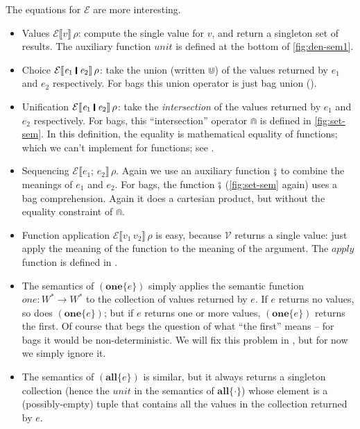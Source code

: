\documentclass[acmsmall,review,dvipsnames]{acmart}
\newcommand{\Varid}[1]{\mathit{#1}}
\newcommand{\Value}{W}
\newcommand{\semfun}[1]{\mathcal{#1}}
\newcommand{\semapp}[3]{\semfun{#1}\llbracket #2 \rrbracket\, #3}
\newcommand{\mtype}{\Value^{*}}
\newcommand{\munit}{\mathit{unit}}
\newcommand{\mintersect}{\Cap}
\newcommand{\munion}{\Cup}
\newcommand{\msemi}{\fatsemi}
\newcommand{\mone}{\mathit{one}}
\newcommand{\apply}{\mathit{apply}}
\begin{document}
The equations for $\semfun{E}$ are more interesting.
\begin{itemize}
\item Values $\semapp{E}{\ensuremath{\Varid{v}}}{\rho}$: compute the single value for \ensuremath{\Varid{v}}, and return a singleton set of results.
The auxiliary function $\munit$ is defined at the bottom of \cref{fig:den-sem1}.
\item Choice $\semapp{E}{\ensuremath{\Varid{e}_{\mathrm{1}}\;\rule[-0.1em]{0.15em}{0.75em}\;\Varid{e}_{\mathrm{2}}}}{\rho}$: take the union (written $\munion$) of the values
  returned by \ensuremath{\Varid{e}_{\mathrm{1}}} and \ensuremath{\Varid{e}_{\mathrm{2}}} respectively.  For bags this union operator is just bag union ().
\item Unification $\semapp{E}{\ensuremath{\Varid{e}_{\mathrm{1}}\;\rule[-0.1em]{0.15em}{0.75em}\;\Varid{e}_{\mathrm{2}}}}{\rho}$: take the \emph{intersection} of the
  values returned by \ensuremath{\Varid{e}_{\mathrm{1}}} and \ensuremath{\Varid{e}_{\mathrm{2}}} respectively. For bags, this ``intersection'' operator $\mintersect$
  is defined in \cref{fig:set-sem}. In this definition, the equality is mathematical equality of functions;
  which we can't implement for functions; see .
\item Sequencing $\semapp{E}{\ensuremath{\Varid{e}_{\mathrm{1}};\,\Varid{e}_{\mathrm{2}}}}{\rho}$. Again we use an auxiliary function $\msemi$ to combine
  the meanings of \ensuremath{\Varid{e}_{\mathrm{1}}} and \ensuremath{\Varid{e}_{\mathrm{2}}}. For bags, the function $\msemi$ (\cref{fig:set-sem} again)
  uses a bag comprehension.  Again it does a cartesian product, but without the equality constraint of $\mintersect$.
\item Function application $\semapp{E}{\ensuremath{\Varid{v}_{\mathrm{1}}\,\Varid{v}_{\mathrm{2}}}}{\rho}$ is easy, because $\semfun{V}$ returns a single value: just apply
  the meaning of the function to the meaning of the argument.  The $\apply$ function is defined in .
\item The semantics of \ensuremath{(\textbf{one}\{\Varid{e}\})} simply applies the semantic function $\mone : \mtype \rightarrow \mtype$ to the
  collection of values returned by \ensuremath{\Varid{e}}.  If \ensuremath{\Varid{e}} returns no values, so does \ensuremath{(\textbf{one}\{\Varid{e}\})}; but if \ensuremath{\Varid{e}} returns one or more values,
  \ensuremath{(\textbf{one}\{\Varid{e}\})} returns the first.  Of course that begs the question of what ``the first'' means -- for bags
  it would be non-deterministic. We will fix this problem in , but for now we simply ignore it.
\item The semantics of \ensuremath{(\textbf{all}\{\Varid{e}\})} is similar, but it always returns a singleton collection
  (hence the $\munit$ in the semantics of \ensuremath{\textbf{all}\{\cdot \}}) whose
  element is a (possibly-empty) tuple that contains all the values in the collection returned by \ensuremath{\Varid{e}}.
\end{itemize}
\end{document}
